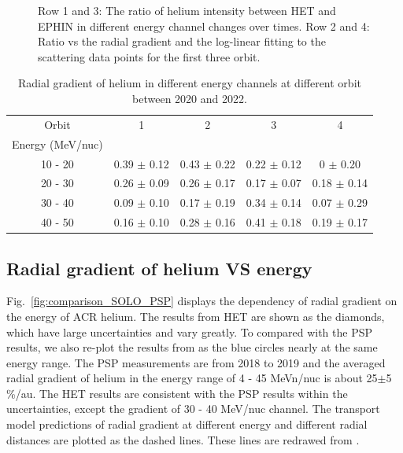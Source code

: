 \begin{figure}[!htb]
    \caption[Ratio of helium intensity between \ac{HET} and \ac{EPHIN} and the radial grdient]{Row 1 and 3: The ratio of helium intensity between \ac{HET} and \ac{EPHIN} in different energy channel changes over times. Row 2 and 4: Ratio vs the radial gradient and the log-linear fitting to the scattering data points for the first three orbit.} 
    \label{fig:ratio_radialgradient}
\end{figure}


\begin{table}[!htb]
    \centering
    \begin{tabular}{|c|c|c|c|c|}
        \hline
    Orbit   & 1                 & 2              & 3               & 4 \\
    Energy (MeV/nuc)  &         &                &                 & \\  
    \hline
    10 - 20 &  0.39 $\pm$ 0.12 & 0.43 $\pm$ 0.22 & 0.22 $\pm$ 0.12 & 0 $\pm$ 0.20 \\
    \hline
    20 - 30 &  0.26 $\pm$ 0.09 & 0.26 $\pm$ 0.17 & 0.17 $\pm$ 0.07 & 0.18 $\pm$ 0.14 \\
    \hline
    30 - 40 &  0.09 $\pm$ 0.10 & 0.17 $\pm$ 0.19 & 0.34 $\pm$ 0.14 & 0.07 $\pm$ 0.29 \\
    \hline
    40 - 50 &  0.16 $\pm$ 0.10 & 0.28 $\pm$ 0.16 & 0.41 $\pm$ 0.18 & 0.19 $\pm$ 0.17 \\
    \hline
    \end{tabular}
    \caption[Table of helium radial gradient]{Radial gradient of helium in different energy channels at different orbit between 2020 and 2022.}
    \label{Tab:radiagradient_1}
\end{table}
\subsection*{Radial gradient of helium VS energy}

Fig.~\ref{fig:comparison_SOLO_PSP} displays the dependency of radial gradient on the energy of \ac{ACR} helium. The results from \ac{HET} are shown as the diamonds, which have large uncertainties and vary greatly.
To compared with the \ac{PSP} results, we also re-plot the results from \citet{Rankin2021ApJ} as the blue circles nearly at the same energy range. The \ac{PSP} measurements are from 2018 to 2019 and the averaged radial gradient of helium in the energy range of 4 - 45 MeVn/nuc is about 25$\pm$5 \%/au. 
The \ac{HET} results are consistent with the \ac{PSP} results within the uncertainties, except the gradient of 30 - 40 MeV/nuc channel.
The transport model predictions of radial gradient at different energy and different radial distances are plotted as the dashed lines. These lines are redrawed from \citet{Rankin2021ApJ,Strauss2010JGRA}.




